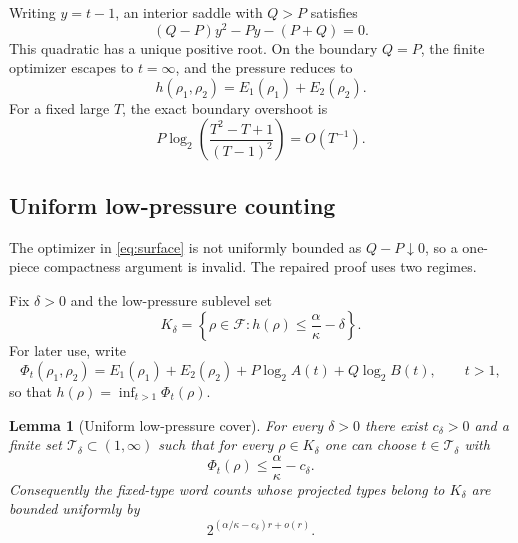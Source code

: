 \documentclass[11pt]{amsart}
\newtheorem{lemma}[theorem]{Lemma}
\newcommand{\Fcal}{\mathcal F}
\begin{document}
Writing \(y=t-1\), an interior saddle with \(Q>P\) satisfies
\begin{equation}\label{eq:saddle}
 (Q-P)y^2-Py-(P+Q)=0.
\end{equation}
This quadratic has a unique positive root.  On the boundary \(Q=P\), the finite optimizer escapes to \(t=\infty\), and the pressure reduces to
\[
 h(\rho_1,\rho_2)=E_1(\rho_1)+E_2(\rho_2).
\]
For a fixed large \(T\), the exact boundary overshoot is
\begin{equation}\label{eq:overshoot}
 P\log_2\left(
 \frac{T^2-T+1}{(T-1)^2}
 \right)=O(T^{-1}).
\end{equation}

\subsection{Uniform low-pressure counting}

The optimizer in \eqref{eq:surface} is not uniformly bounded as \(Q-P\downarrow0\), so a one-piece compactness argument is invalid.  The repaired proof uses two regimes.

Fix \(\delta>0\) and the low-pressure sublevel set
\[
 K_\delta=
 \left\{\rho\in\Fcal:
 h(\rho)\le\frac{\alpha}{\kappa}-\delta
 \right\}.
\]
For later use, write
\[
 \Phi_t(\rho_1,\rho_2)
 =E_1(\rho_1)+E_2(\rho_2)
 +P\log_2A(t)+Q\log_2B(t),
 \qquad t>1,
\]
so that \(h(\rho)=\inf_{t>1}\Phi_t(\rho)\).

\begin{lemma}[Uniform low-pressure cover]\label{lem:uniform-low-pressure}
For every \(\delta>0\) there exist \(c_\delta>0\) and a finite set
\(\mathcal T_\delta\subset(1,\infty)\) such that for every
\(\rho\in K_\delta\) one can choose \(t\in\mathcal T_\delta\) with
\[
 \Phi_t(\rho)\le \frac{\alpha}{\kappa}-c_\delta.
\]
Consequently the fixed-type word counts whose projected types belong to
\(K_\delta\) are bounded uniformly by
\[
 2^{(\alpha/\kappa-c_\delta)r+o(r)}.
\]
\end{lemma}
\end{document}

